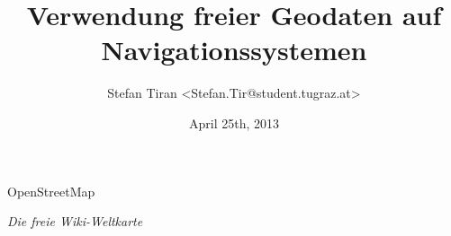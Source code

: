 \documentclass{beamer}
\title{Verwendung freier Geodaten auf Navigationssystemen}
\author{Stefan Tiran \textless Stefan.Tir@student.tugraz.at\textgreater}
\date{April 25th, 2013}
\begin{document}

\begin{frame}



\begin{center}
\Huge{OpenStreetMap\\}
\end{center}

\begin{center}
\Large{\emph{Die freie Wiki-Weltkarte}}
\end{center}
\end{frame}
\end{document}
